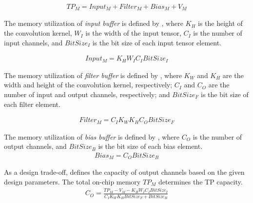 \begin{eqnarray} \label{eq:tp_memory}
TP_{M}=Input_{M}+Filter_{M}+Bias_{M}+V_{M}
\end{eqnarray}

The memory utilization of \emph{input buffer} is defined by , where $K_{H}$ is the height of the convolution kernel, $W_{I}$ is the width of the input tensor, $C_{I}$ is the number of input channels, and $BitSize_{I}$ is the bit size of each input tensor element.

\begin{eqnarray} \label{eq:input_memory}
Input_{M}=K_{H}W_{I}C_{I}BitSize_{I}
\end{eqnarray}

The memory utilization of \emph{filter buffer} is defined by , where $K_{W}$ and $K_{H}$ are the width and height of the convolution kernel, respectively; $C_{I}$ and $C_{O}$ are the number of input and output channels, respectively; and $BitSize_{F}$ is the bit size of each filter element.

\begin{eqnarray} \label{eq:filter_memory}
Filter_{M}=C_{I}K_{W}K_{H}C_{O}BitSize_{F}
\end{eqnarray}

The memory utilization of \emph{bias buffer} is defined by , where $C_{O}$ is the number of output channels, and $BitSize_{B}$ is the bit size of each bias element.
\begin{eqnarray} \label{eq:bias_memory}
Bias_{M}=C_{O}BitSize_{B}
\end{eqnarray}

As a design trade-off,  defines the capacity of output channels based on the given design parameters. The total on-chip memory $TP_{M}$ determines the TP capacity.
\begin{eqnarray} \label{eq:channel_in_memory}
C_{O}=\frac{TP_{M}-V_{M}-K_{H}W_{I}C_{I}BitSize_{I}}{C_{I}K_{W}K_{H}BitSize_{F}+BitSize_{B}}
\end{eqnarray}


